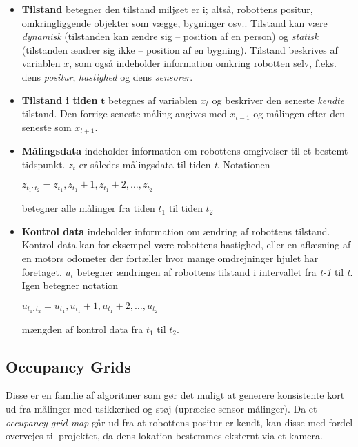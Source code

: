 \begin{itemize}
\item \textbf{Tilstand} betegner den tilstand miljøet er i; altså, robottens positur, omkringliggende objekter som vægge, bygninger osv.. 
Tilstand kan være \textit{dynamisk} (tilstanden kan ændre sig -- position af en person) og \textit{statisk} (tilstanden ændrer sig ikke -- position af en bygning).
Tilstand beskrives af variablen $x$, som også indeholder information omkring robotten selv, f.eks. dens \textit{positur}, \textit{hastighed} og dens \textit{sensorer}.

\item \textbf{Tilstand i tiden} $\mathbf{t}$ betegnes af variablen $x_t$ og beskriver den seneste \textit{kendte} tilstand. 
Den forrige seneste måling angives med $x_{t-1}$ og målingen efter den seneste som $x_{t+1}$.

\item \textbf{Målingsdata} indeholder information om robottens omgivelser til et bestemt tidspunkt. 
$z_t$ er således målingsdata til tiden \textit{t}. 
Notationen

$z_{t_1:t_2} = z_{t_1}, z_{t_1}+1, z_{t_1}+2, \dots , z_{t_2}$

betegner alle målinger fra tiden \textit{$ t_1 $} til tiden \textit{$ t_2 $}
\item \textbf{Kontrol data} indeholder information om ændring af robottens tilstand. 
Kontrol data kan for eksempel være robottens hastighed, eller en aflæsning af en motors odometer der fortæller hvor mange omdrejninger hjulet har foretaget.
$u_t$ betegner ændringen af robottens tilstand i intervallet fra \textit{t-1} til \textit{t}.
Igen betegner notation

$u_{t_1:t_2} = u_{t_1}, u_{t_1}+1, u_{t_1}+2, \dots , u_{t_2}$

mængden af kontrol data fra \textit{$ t_1 $} til \textit{$ t_2 $}.
\end{itemize}


\subsection{Occupancy Grids}\label{mapping:occupancy_grid}
Disse er en familie af algoritmer som gør det muligt at generere konsistente kort ud fra målinger med usikkerhed og støj (upræcise sensor målinger).
Da et \textit{occupancy grid map} går ud fra at robottens positur er kendt, kan disse med fordel overvejes til projektet, da dens lokation bestemmes eksternt via et kamera. \cite[s.~224]{probabilisticRobotics}

